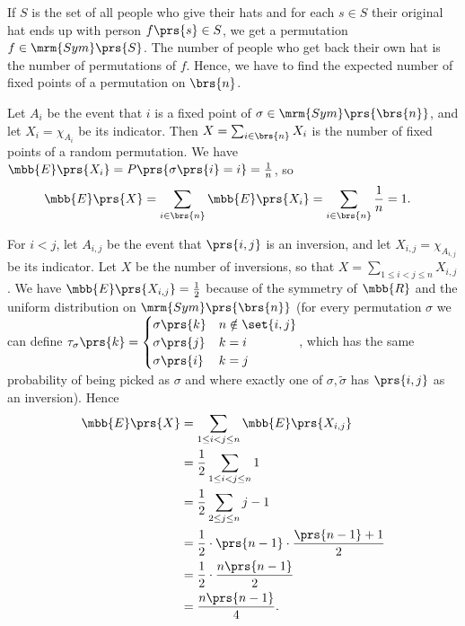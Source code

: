 \documentclass[oneside]{scrbook}
\theoremstyle{definition}
\begin{document}
\begin{exercise}
If $S$ is the set of all people who give their hats and for each $s \in S$ their original hat ends up with person $f\prs{s} \in S$, we get a permutation $f \in \mrm{Sym}\prs{S}$. The number of people who get back their own hat is the number of permutations of $f$. Hence, we have to find the expected number of fixed points of a permutation on $\brs{n}$.

Let $A_i$ be the event that $i$ is a fixed point of $\sigma \in \mrm{Sym}\prs{\brs{n}}$, and let $X_i = \chi_{A_i}$ be its indicator. Then $X = \sum_{i \in \brs{n}} X_i$ is the number of fixed points of a random permutation. We have $\mbb{E}\prs{X_i} = P\prs{\sigma\prs{i} = i} = \frac{1}{n}$, so
\begin{align*}
\mbb{E}\prs{X} &= \sum_{i \in \brs{n}} \mbb{E}\prs{X_i} = \sum_{i \in \brs{n}} \frac{1}{n} = 1 \text{.}
\end{align*}
\end{exercise}

\begin{exercise}
For $i < j$, let $A_{i,j}$ be the event that $\prs{i,j}$ is an inversion, and let $X_{i,j} = \chi_{A_{i,j}}$ be its indicator. Let $X$ be the number of inversions, so that $X = \sum_{1 \leq i < j \leq n} X_{i,j}$.
We have $\mbb{E}\prs{X_{i,j}} = \frac{1}{2}$ because of the symmetry of $\mbb{R}$ and the uniform distribution on $\mrm{Sym}\prs{\brs{n}}$ (for every permutation $\sigma$ we can define $\tau_\sigma\prs{k} = \begin{cases}\sigma\prs{k} & n \notin \set{i,j} \\ \sigma\prs{j} & k = i \\ \sigma\prs{i} & k = j\end{cases}$, which has the same probability of being picked as $\sigma$ and where exactly one of $\sigma, \tilde{\sigma}$ has $\prs{i,j}$ as an inversion).
Hence
\begin{align*}
\mbb{E}\prs{X} &= \sum_{1 \leq i < j \leq n} \mbb{E}\prs{X_{i,j}}
\\&=
\frac{1}{2} \sum_{1 \leq i < j \leq n} 1
\\&=
\frac{1}{2} \sum_{2 \leq j \leq n} j-1
\\&=
\frac{1}{2} \cdot \prs{n-1} \cdot \frac{\prs{n-1} + 1}{2}
\\&=
\frac{1}{2} \cdot \frac{n \prs{n-1}}{2}
\\&=
\frac{n\prs{n-1}}{4}
\text{.}
\end{align*}
\end{exercise}
\end{document}
